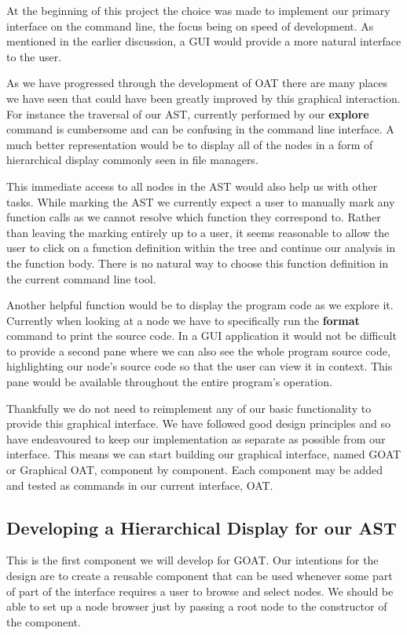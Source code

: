 \documentclass[twoside,a4paper]{report}
\begin{document}
At the beginning of this project the choice was made to implement our primary interface on the command line, the focus being on speed of development. As
mentioned in the earlier discussion, a GUI would provide a more natural interface to the user.

As we have progressed through the development of OAT there are many places we have seen that could have been greatly improved by this graphical interaction.
For instance the traversal of our AST, currently performed by our \textbf{explore} command is cumbersome and can be confusing in the command line interface. A
much better representation would be to display all of the nodes in a form of hierarchical display commonly seen in file managers.

This immediate access to all nodes in the AST would also help us with other tasks. While marking the AST we currently expect a user to manually mark any function
calls as we cannot resolve which function they correspond to. Rather than leaving the marking entirely up to a user, it seems reasonable to allow the user to
click on a function definition within the tree and continue our analysis in the function body. There is no natural way to choose this function definition
in the current command line tool.

Another helpful function would be to display the program code as we explore it. Currently when looking at a node we have to specifically run the \textbf{format}
command to print the source code. In a GUI application it would not be difficult to provide a second pane where we can also see the whole program source code,
highlighting our node's source code so that the user can view it in context. This pane would be available throughout the entire program's operation.

Thankfully we do not need to reimplement any of our basic functionality to provide this graphical interface. We have followed good design principles and so have
endeavoured to keep our implementation as separate as possible from our interface. This means we can start building our graphical interface, named GOAT or
Graphical OAT, component by component. Each component may be added and tested as commands in our current interface, OAT.

\subsection{Developing a Hierarchical Display for our AST}

This is the first component we will develop for GOAT. Our intentions for the design are to create a reusable component that can be used whenever some part of
part of the interface requires a user to browse and select nodes. We should be able to set up a node browser just by passing a root node to the
constructor of the component.
\end{document}
